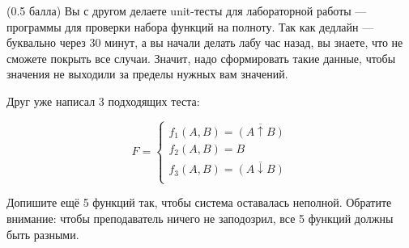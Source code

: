 \question
(0.5 балла) Вы с другом делаете unit-тесты для лабораторной работы — программы для проверки набора функций на полноту. Так как дедлайн — буквально через 30 минут, а вы начали делать лабу час назад, вы знаете, что не сможете покрыть все случаи. Значит, надо сформировать такие данные, чтобы значения не выходили за пределы нужных вам значений.

Друг уже написал 3 подходящих теста:

\begin{equation*}
    F=
    \begin{cases}
        f_1(A,B)=\overline{(A \uparrow B)}\\
        f_2(A,B)=B\\
        f_3(A,B)=\overline{(A \downarrow B)}\\
    \end{cases}
\end{equation*}
    
Допишите ещё 5 функций так, чтобы система оставалась неполной. Обратите внимание: чтобы преподаватель ничего не заподозрил, все 5 функций должны быть разными.